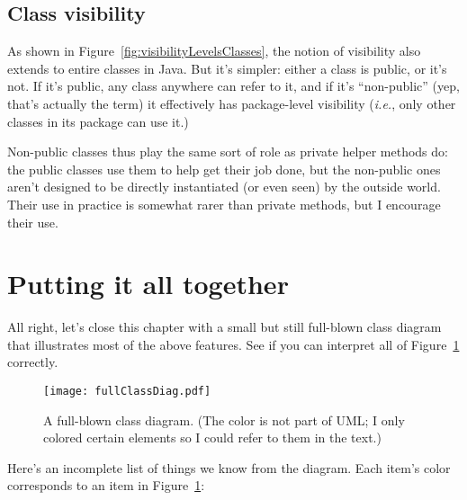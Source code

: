\subsection{Class visibility}

As shown in Figure~\ref{fig:visibilityLevelsClasses}, the notion of visibility
also extends to entire classes in Java. But it's simpler: either a class is
public, or it's not. If it's public, any class anywhere can refer to it, and
if it's ``non-public'' (yep, that's actually the term) it effectively has
package-level visibility (\textit{i.e.}, only other classes in its package can
use it.)

Non-public classes thus play the same sort of role as private helper methods
do: the public classes use them to help get their job done, but the non-public
ones aren't designed to be directly instantiated (or even seen) by the outside
world. Their use in practice is somewhat rarer than private methods, but I
encourage their use.


\section{Putting it all together}

All right, let's close this chapter with a small but still full-blown class
diagram that illustrates most of the above features. See if you can interpret
all of Figure~\ref{fig:fullClassDiag} correctly.

\begin{figure}[ht]
\centering
\texttt{[image: fullClassDiag.pdf]}   %
\caption{A full-blown class diagram. (The color is not part of UML; I only
colored certain elements so I could refer to them in the text.)}
\label{fig:fullClassDiag}
\end{figure}

Here's an incomplete list of things we know from the diagram. Each item's
color corresponds to an item in Figure~\ref{fig:fullClassDiag}:

